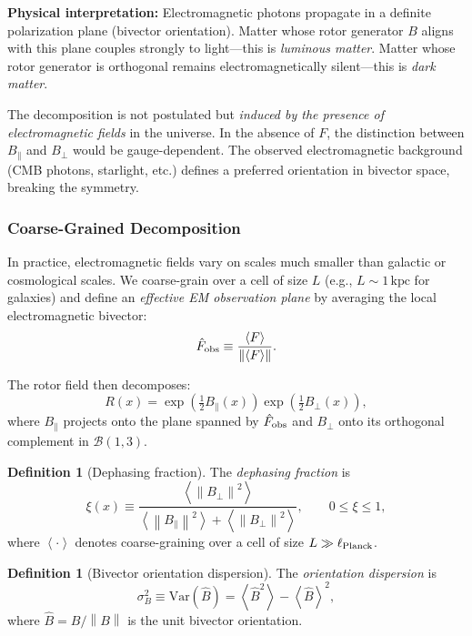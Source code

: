 \documentclass[11pt,a4paper]{article}
\numberwithin{equation}{section}
\theoremstyle{plain}
\theoremstyle{definition}
\newtheorem{definition}[theorem]{Definition}
\theoremstyle{remark}
\newcommand{\Var}{\mathrm{Var}}
\newcommand{\norm}[1]{\left\lVert#1\right\rVert}
\newcommand{\avg}[1]{\left\langle #1 \right\rangle}
\newcommand{\bivec}{\mathcal{B}}            %
\begin{document}
\textbf{Physical interpretation:} Electromagnetic photons propagate in a definite polarization plane (bivector orientation). Matter whose rotor generator $B$ aligns with this plane couples strongly to light---this is \emph{luminous matter}. Matter whose rotor generator is orthogonal remains electromagnetically silent---this is \emph{dark matter}.

The decomposition is not postulated but \emph{induced by the presence of electromagnetic fields} in the universe. In the absence of $F$, the distinction between $B_\parallel$ and $B_\perp$ would be gauge-dependent. The observed electromagnetic background (CMB photons, starlight, etc.) defines a preferred orientation in bivector space, breaking the symmetry.

\subsubsection{Coarse-Grained Decomposition}

In practice, electromagnetic fields vary on scales much smaller than galactic or cosmological scales. We coarse-grain over a cell of size $L$ (e.g., $L\sim 1\,\text{kpc}$ for galaxies) and define an \emph{effective EM observation plane} by averaging the local electromagnetic bivector:
\begin{equation}
\hat F_{\rm obs} \equiv \frac{\avg{F}}{\norm{\avg{F}}}.
\end{equation}

The rotor field then decomposes:
\begin{equation}
R(x)=\exp\!\left(\tfrac12 B_\parallel(x)\right)\exp\!\left(\tfrac12 B_\perp(x)\right),
\label{eq:rotor-decomp}
\end{equation}
where $B_\parallel$ projects onto the plane spanned by $\hat F_{\rm obs}$ and $B_\perp$ onto its orthogonal complement in $\bivec(1,3)$.

\begin{definition}[Dephasing fraction]
The \emph{dephasing fraction} is
\begin{equation}
\xi(x) \equiv \frac{\avg{ \norm{B_\perp}^2 }}{\avg{ \norm{B_\parallel}^2 }+\avg{ \norm{B_\perp}^2 }},
\qquad 0\le\xi\le 1,
\label{eq:xi-def}
\end{equation}
where $\avg{\cdot}$ denotes coarse-graining over a cell of size $L\gg \ell_{\rm Planck}$.
\end{definition}

\begin{definition}[Bivector orientation dispersion]
The \emph{orientation dispersion} is
\begin{equation}
\sigma_B^2 \equiv \Var(\hat B) = \avg{\hat B^2} - \avg{\hat B}^2,
\end{equation}
where $\hat B = B/\norm{B}$ is the unit bivector orientation.
\end{definition}
\end{document}
